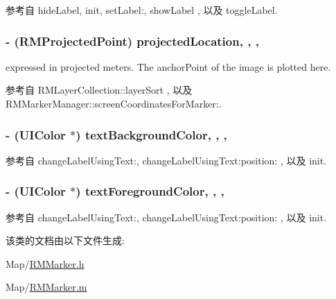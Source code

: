 参考自 hide\-Label, init, set\-Label\-:, show\-Label , 以及 toggle\-Label.

\hypertarget{interface_r_m_marker_ac810ea4f4af07c3b3fc5300fe40eebd5}{
\subsubsection[{projected\-Location}]{\setlength{\rightskip}{0pt plus 5cm}-\/ ({\bf R\-M\-Projected\-Point}) projected\-Location\hspace{0.3cm}{\ttfamily [read]}, {\ttfamily [write]}, {\ttfamily [nonatomic]}, {\ttfamily [assign]}}}\label{interface_r_m_marker_ac810ea4f4af07c3b3fc5300fe40eebd5}


expressed in projected meters. The anchor\-Point of the image is plotted here. 



参考自 R\-M\-Layer\-Collection\-::layer\-Sort , 以及 R\-M\-Marker\-Manager\-::screen\-Coordinates\-For\-Marker\-:.

\hypertarget{interface_r_m_marker_a75d470aa3039d2fc8212550c7e18a401}{
\subsubsection[{text\-Background\-Color}]{\setlength{\rightskip}{0pt plus 5cm}-\/ (U\-I\-Color $\ast$) text\-Background\-Color\hspace{0.3cm}{\ttfamily [read]}, {\ttfamily [write]}, {\ttfamily [nonatomic]}, {\ttfamily [retain]}}}\label{interface_r_m_marker_a75d470aa3039d2fc8212550c7e18a401}


参考自 change\-Label\-Using\-Text\-:, change\-Label\-Using\-Text\-:position\-: , 以及 init.

\hypertarget{interface_r_m_marker_a8c17bd3321a486c5738c5b7521e07022}{
\subsubsection[{text\-Foreground\-Color}]{\setlength{\rightskip}{0pt plus 5cm}-\/ (U\-I\-Color $\ast$) text\-Foreground\-Color\hspace{0.3cm}{\ttfamily [read]}, {\ttfamily [write]}, {\ttfamily [nonatomic]}, {\ttfamily [retain]}}}\label{interface_r_m_marker_a8c17bd3321a486c5738c5b7521e07022}


参考自 change\-Label\-Using\-Text\-:, change\-Label\-Using\-Text\-:position\-: , 以及 init.



该类的文档由以下文件生成\-:\begin{DoxyCompactItemize}
\item 
Map/\hyperlink{_r_m_marker_8h}{R\-M\-Marker.\-h}\item 
Map/\hyperlink{_r_m_marker_8m}{R\-M\-Marker.\-m}\end{DoxyCompactItemize}
